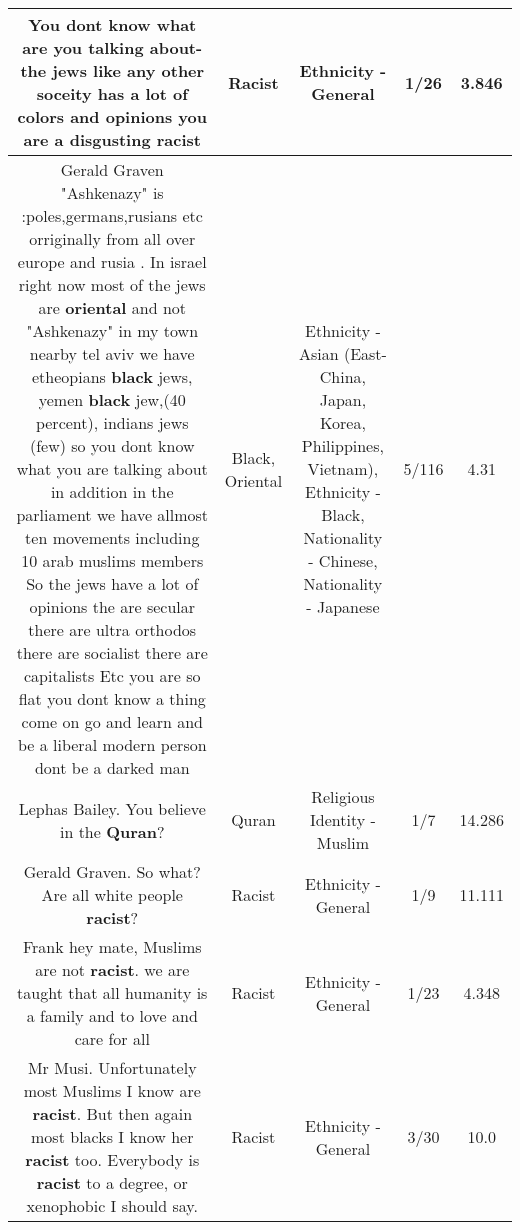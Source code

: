 \documentclass[11pt]{article}
\newlength\mylength
\begin{document}
\begin{center}
\begin{longtable}{|C{.65\mylength}|C{.30\mylength}|C{.12\mylength}|C{.12\mylength}|C{.12\mylength}|}
  \small You dont know what are you talking about- the jews like any other soceity has a lot of colors and opinions you are a disgusting racist\normalsize   & Racist & Ethnicity - General & 1/26 & 3.846 \\  \hline
  \small Gerald Graven "Ashkenazy" is :poles,germans,rusians etc orriginally from all over europe and rusia . In israel right now most of the jews are \textbf{o\textbf{r\textbf{iental}}} and not "Ashkenazy" in my town nearby tel aviv we have etheopians \textbf{black} jews, yemen \textbf{black} jew,(40 percent), indians jews (few) so you dont know what you are talking about in addition in the parliament we have allmost ten movements including 10 arab muslims members So the jews have a lot of opinions the are secular there are ultra orthodos there are socialist there are capitalists Etc you are so flat you dont know a thing come on go and learn and be a liberal modern person dont be a darked man\normalsize   & Black, Oriental & Ethnicity - Asian (East- China, Japan, Korea, Philippines, Vietnam), Ethnicity - Black, Nationality - Chinese, Nationality - Japanese & 5/116 & 4.31 \\  \hline
  \small Lephas Bailey. You believe in the \textbf{Quran}?\normalsize   & Quran & Religious Identity - Muslim & 1/7 & 14.286 \\  \hline
  \small Gerald Graven. So what? Are all white people \textbf{racist}?\normalsize   & Racist & Ethnicity - General & 1/9 & 11.111 \\  \hline
  \small Frank hey mate, Muslims are not \textbf{racist}. we are taught that all humanity is a family and to love and care for all\normalsize   & Racist & Ethnicity - General & 1/23 & 4.348 \\  \hline
  \small Mr Musi. Unfortunately most Muslims I know are \textbf{racist}. But then again most blacks I know her \textbf{racist} too. Everybody is \textbf{racist} to a degree, or xenophobic I should say.\normalsize   & Racist & Ethnicity - General & 3/30 & 10.0 \\  \hline

\end{longtable}
\end{center}
\end{document}
